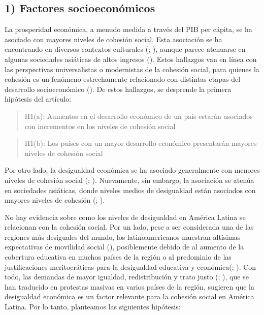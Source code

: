 \documentclass[
  spanish,
  letterpaper,
  DIV=11,
  numbers=noendperiod]{scrartcl}
\begin{document}
\subsection{1) Factores
socioeconómicos}\label{factores-socioeconuxf3micos}

La prosperidad económica, a menudo medida a través del PIB per cápita,
se ha asociado con mayores niveles de cohesión social. Esta asociación
se ha encontrando en diversos contextos culturales
(;
),
aunque parece atenuarse en algunas sociedades asiáticas de altos
ingresos (). Estos
hallazgos van en línea con las perspectivas universalistas o modernistas
de la cohesión social, para quienes la cohesión es un fenómeno
estrechamente relacionado con distintas etapas del desarrollo
socioeconómico (). De
estos hallazgos, se desprende la primera hipótesis del artículo:

\begin{quote}
H1(a): Aumentos en el desarrollo económico de un país estarán asociados
con incrementos en los niveles de cohesión social
\end{quote}

\begin{quote}
H1(b): Los países con un mayor desarrollo económico presentarán mayores
niveles de cohesión social
\end{quote}

Por otro lado, la desigualdad económica se ha asociado generalmente con
menores niveles de cohesión social
(;
). Nuevamente, sin
embargo, la asociación se atenúa en sociedades asiáticas, donde niveles
medios de desigualdad están asociados con mayores niveles de cohesión
(;
).

No hay evidencia sobre como los niveles de desigualdad en América Latina
se relacionan con la cohesión social. Por un lado, pese a ser
considerada una de las regiones más desiguales del mundo, los
latinoamericanos muestran altísimas expectativas de movilidad social
(),
posiblemente debido de al aumento de la cobertura educativa en muchos
países de la región o al predominio de las justificaciones
meritocráticas para la desigualdad educativa y
económica(;
). Con todo, las demandas de mayor igualdad, redistribución y trato
justo (;
), que se han
traducido en protestas masivas en varios países de la región, sugieren
que la desigualdad económica es un factor relevante para la cohesión
social en América Latina. Por lo tanto, planteamos las siguientes
hipótesis:
\end{document}
